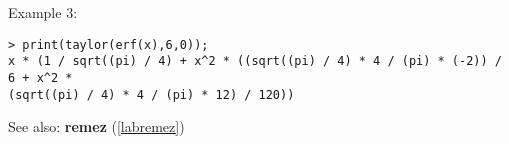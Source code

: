 \noindent Example 3: 
\begin{center}\begin{minipage}{15cm}\begin{Verbatim}[frame=single]
> print(taylor(erf(x),6,0));
x * (1 / sqrt((pi) / 4) + x^2 * ((sqrt((pi) / 4) * 4 / (pi) * (-2)) / 6 + x^2 * 
(sqrt((pi) / 4) * 4 / (pi) * 12) / 120))
\end{Verbatim}
\end{minipage}\end{center}
See also: \textbf{remez} (\ref{labremez})
